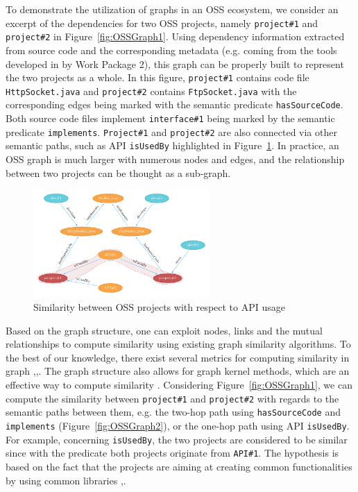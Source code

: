  
To demonstrate the utilization of graphs in an OSS ecosystem, we consider an excerpt of the dependencies for two OSS projects, namely \texttt{project\#1} and \texttt{project\#2} in Figure~\ref{fig:OSSGraph1}. Using dependency information extracted from source code and the corresponding metadata (e.g. coming from the tools developed in by Work Package 2), this graph can be properly built to represent the two projects as a whole. In this figure, \texttt{project\#1} contains code file \texttt{HttpSocket.java} and \texttt{project\#2} contains \texttt{FtpSocket.java} with the corresponding edges being marked with the semantic predicate \texttt{hasSourceCode}. Both source code files implement \texttt{interface\#1} being marked by the semantic predicate \texttt{implements}. \texttt{Project\#1} and \texttt{project\#2} are also connected via other semantic paths, such as API \texttt{isUsedBy} highlighted in Figure~\ref{fig:OSSGraph3}. In practice, an OSS graph is much larger with numerous nodes and edges, and the relationship between two projects can be thought as a sub-graph. 
 
 \begin{figure}[h!]
 	\centering
 	\includegraphics[width=0.60\textwidth]{images/OSSGraph3.pdf}
 	\caption{Similarity between OSS projects with respect to API usage}
 	\label{fig:OSSGraph3}
 \end{figure}
 
 
Based on the graph structure, one can exploit nodes, links and the mutual relationships to compute similarity using existing graph similarity algorithms. To the best of our knowledge, there exist several metrics for computing similarity in graph \cite{Blondel:2004:MSG:1035533.1035557},\cite{Nguyen:2015:CRV:2942298.2942305},\cite{Nguyen:2015:ESP:2740908.2742141}. The graph structure also allows for graph kernel methods, which are an effective way to compute similarity \cite{ODMD14a}. Considering Figure~\ref{fig:OSSGraph1}, we can compute the similarity between \texttt{project\#1} and \texttt{project\#2} with regards to the semantic paths between them, e.g. the two-hop path using \texttt{hasSourceCode} and \texttt{implements} (Figure~\ref{fig:OSSGraph2}), or the one-hop path using API \texttt{isUsedBy}. For example, concerning \texttt{isUsedBy}, the two projects are considered to be similar since with the predicate both projects originate from \texttt{API\#1}. The hypothesis is based on the fact that the projects are aiming at creating common functionalities by using common libraries \cite{McMillan:2012:DSS:2337223.2337267},\cite{6671293}.
 
